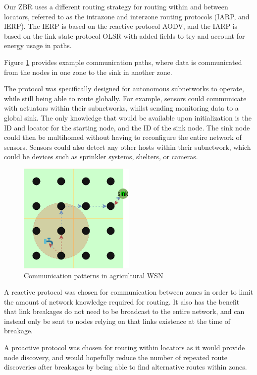 \documentclass[12pt]{article}
\begin{document}
Our ZBR uses a different routing strategy for routing within and between locators, referred to as the intrazone and interzone routing protocols (IARP, and IERP). The IERP is based on the reactive protocol AODV, and the IARP is based on the link state protocol OLSR with added fields to try and account for energy usage in paths. 

Figure \ref{fig:actuate} provides example communication paths, where data is communicated from the nodes in one zone to the sink in another zone.

The protocol was specifically designed for autonomous subnetworks to operate, while still being able to route globally. For example, sensors could communicate with actuators within their subnetworks, whilst sending monitoring data to a global sink. The only knowledge that would be available upon initialization is the ID and locator for the starting node, and the ID of the sink node. The sink node could then be multihomed without having to reconfigure the entire network of sensors. Sensors could also detect any other hosts within their subnetwork, which could be devices such as sprinkler systems, shelters, or cameras.

\begin{figure}[!ht]
	\centering
	\includegraphics[width=0.5\linewidth]{images/actuate}
	\caption{Communication patterns in agricultural WSN}
	\label{fig:actuate}
\end{figure}

A reactive protocol was chosen for communication between zones in order to limit the amount of network knowledge required for routing. It also has the benefit that link breakages do not need to be broadcast to the entire network, and can instead only be sent to nodes relying on that links existence at the time of breakage.

A proactive protocol was chosen for routing within locators as it would provide node discovery, and would hopefully reduce the number of repeated route discoveries after breakages by being able to find alternative routes within zones.
\end{document}

